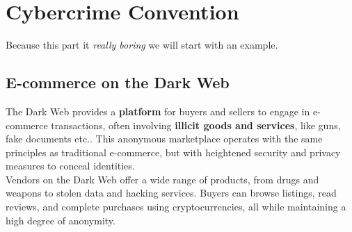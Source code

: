 \chapter{Cybercrime Convention}
Because this part it \textit{really boring} we will start with an
example.
\section{E-commerce on the Dark Web}
The Dark Web provides a \textbf{platform} for buyers and sellers to
engage in e-commerce transactions, often involving \textbf{illicit
goods and services}, like guns, fake documents etc.. This anonymous
marketplace operates with the same principles as traditional
e-commerce, but with heightened security and privacy measures to
conceal identities.\\
Vendors on the Dark Web offer a wide range of products, from drugs and
weapons to stolen data and hacking services. Buyers can browse
listings, read reviews, and complete purchases using cryptocurrencies,
all while maintaining a high degree of anonymity.
